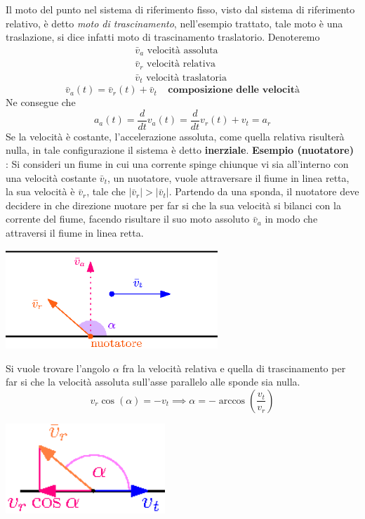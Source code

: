 \documentclass[10pt, letterpaper]{report}
\begin{document}
\acc 
Il moto del punto nel sistema di riferimento fisso, visto dal sistema di riferimento relativo, è 
detto \textit{moto di trascinamento}, nell'esempio trattato, tale moto è una traslazione, si dice 
infatti moto di trascinamento traslatorio. Denoteremo $$ \begin{matrix}
    \bar v_a \text{ velocità assoluta }\\ 
    \bar v_r \text{ velocità relativa }\\ 
    \bar v_t \text{ velocità traslatoria }
\end{matrix}$$ 
$$\bar v_a(t)=\bar v_r(t)+\bar v_t \ \ \ \ \ \textbf{composizione delle velocità}$$ 
Ne consegue che 
$$a_a(t)=\frac{d}{dt}v_a(t)=\frac{d}{dt}v_r(t)+v_t=a_r $$ 
Se la velocità è costante, l'accelerazione assoluta, come quella relativa risulterà nulla, in tale 
configurazione il sistema è detto \textbf{inerziale}.\acc 
\textbf{Esempio (nuotatore)} : Si consideri un fiume in cui una corrente spinge chiunque vi sia all'interno 
con una velocità costante $\bar v_t$, un nuotatore, vuole attraversare il fiume in linea retta, 
la sua velocità è $\bar v_r$, tale che $|\bar v_r|>|\bar v_t|$.\acc 
Partendo da una sponda, il nuotatore deve decidere in che direzione nuotare per far si che 
la sua velocità si bilanci con la corrente del fiume, facendo risultare il suo moto 
assoluto $\bar v_a$ in modo che attraversi il fiume in linea retta.
\begin{center}
    \includegraphics[width=0.6\textwidth]{images/nuotatore.eps}
\end{center}
Si vuole trovare l'angolo $\alpha$ fra la velocità relativa e quella di trascinamento per far 
si che la velocità assoluta sull'asse  parallelo alle sponde sia nulla.
$$ v_r \cos(\alpha)=- v_t \implies \alpha = -\arccos(\frac{v_t}{v_r}) $$ 
\begin{center}
    \includegraphics[width=0.45\textwidth]{images/nuotatore2.eps}
\end{center}
\end{document}
